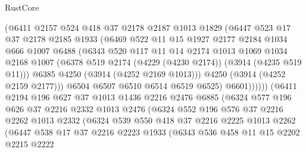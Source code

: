 \begin{lexlean}{RustCore}
\begin{coremodule}
                  (@6411
                    @2157
                    @524
                    @418
                    @37
                    @2178
                    @2187
                    @1013
                    @1829
                    (@6447
                      @523
                      @17
                      @37
                      @2178
                      @2185
                      @1933
                      (@6469
                        @522
                        @11
                        @15
                        @1927
                        @2177
                        @2184
                        @1034
                        @666
                        @1007
                        @6488
                        (@6343
                          @520
                          @117
                          @11
                          @14
                          @2174
                          @1013
                          @1069
                          @1034
                          @2168
                          @1007
                          (@6378 @519 @2174 (@4229 (@4230 @2174)) (@3914 (@4235 @519 @11)))
                          @6385
                          @4250
                          (@3914 (@4252 @2169 @1013)))
                        @4250
                        (@3914 (@4252 @2159 @2177)))
                      @6504
                      @6507
                      @6510
                      @6514
                      @6519
                      @6525)
                    @6601))))))
        (@6411
          @2194
          @196
          @627
          @37
          @1013
          @1436
          @2216
          @2476
          @6885
          (@6324
            @577
            @196
            @626
            @37
            @2216
            @2332
            @1013
            @2476
            (@6324
              @552
              @196
              @576
              @37
              @2216
              @2262
              @1013
              @2332
              (@6324
                @539
                @550
                @418
                @37
                @2216
                @2225
                @1013
                @2262
                (@6447
                  @538
                  @17
                  @37
                  @2216
                  @2223
                  @1933
                  (@6343
                    @536
                    @458
                    @11
                    @15
                    @2202
                    @2215
                    @2222

\end{coremodule}
\end{lexlean}

